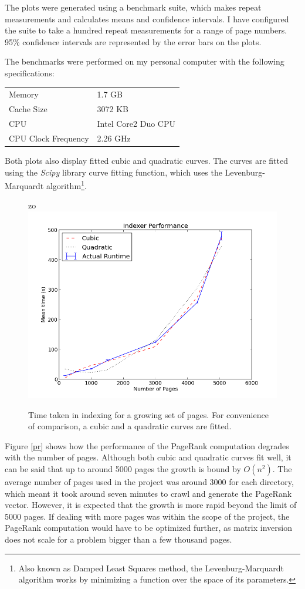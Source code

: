 \documentclass[12pt,notitlepage,twoside]{scrbook}
\begin{document}
The plots were generated using a benchmark suite, which makes repeat measurements and
calculates means and confidence intervals. I have configured the suite to take a hundred
repeat measurements for a range of page numbers. 95\% confidence intervals are represented by
the error bars on the plots.

The benchmarks were performed on my personal computer with the following specifications:

\begin{tabular}[h!]{l l}
Memory & 1.7 GB \\
Cache Size & 3072 KB \\
CPU & Intel Core2 Duo CPU \\
CPU Clock Frequency & 2.26 GHz \\
\end{tabular}

Both plots also display fitted cubic and quadratic curves. The curves are fitted using the
\textit{Scipy} library curve fitting function, which uses the Levenburg-Marquardt
algorithm\footnote{Also known as Damped Least Squares method, the Levenburg-Marquardt
algorithm works by minimizing a function over the space of its parameters.}. 
\begin{figure}[h!]zo
  \centering
    \includegraphics[width=0.8\linewidth]{figs/ind.png}
    \caption{Time taken in indexing for a growing set of pages. For convenience
	    of comparison, a cubic and a quadratic curves are fitted.\label{ind}}
\end{figure}
Figure \ref{pr} shows how the performance of the PageRank computation degrades with the
number of pages. Although both cubic and quadratic curves fit well, it can be said that
up to around 5000 pages the growth is bound by \(O(n^2)\). The average number of pages
used in the project was around 3000 for each directory, which meant it took around seven
minutes to crawl and generate the PageRank vector.  However, it is expected that the
growth is more rapid beyond the limit of 5000 pages. If dealing with more pages was within
the scope of the project, the PageRank computation would have to be optimized further, as
matrix inversion does not scale for a problem bigger than a few thousand pages.
\end{document}
